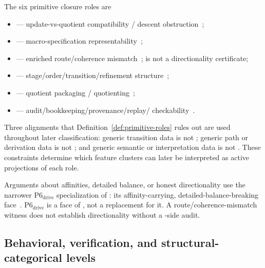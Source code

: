 \begin{definition}\label{def:primitive-roles}
The six primitive closure roles are
\begin{itemize}[topsep=2pt,itemsep=1pt]
  \item \Pone{} --- update-vs-quotient compatibility / descent
    obstruction~\citep{GrothendieckSGA1,JanelidzeTholen1994};
  \item \Ptwo{} --- macro-specification
    representability~\citep{MacLane1998};
  \item \Pthree{} --- enriched route/coherence
    mismatch~\citep{BaaderNipkow1998,Nakahara2003}; \Pthree{} is not a
    directionality certificate;
  \item \Pfour{} --- stage/order/transition/refinement
    structure~\citep{Milner1989,BackVonWright1998};
  \item \Pfive{} --- quotient packaging /
    quotienting~\citep{KemenySnell1960};
  \item \Psix{} --- audit/bookkeeping/provenance/replay/%
    checkability~\citep{GreenKarvounarakisTannen2007,Merkle1987}.
\end{itemize}
\end{definition}

\begin{remark}\label{rem:repaired-alignments}
Three alignments that Definition~\ref{def:primitive-roles} rules out
are used throughout later classification: generic transition data is
not \Pthree{}; generic path or derivation data is not \Pfive{}; and
generic semantic or interpretation data is not \Pone{}. These
constraints determine which feature clusters can later be interpreted
as active projections of each role.
\end{remark}

\begin{remark}\label{rem:p6-drive}
Arguments about affinities, detailed balance, or honest directionality
use the narrower \(\mathrm{P6}_{\mathrm{drive}}\) specialization of
\Psix{}: its affinity-carrying, detailed-balance-breaking
face~\citep{Seifert2012}. \(\mathrm{P6}_{\mathrm{drive}}\) is a face
of \Psix{}, not a replacement for it. A \Pthree{}
route/coherence-mismatch witness does not establish directionality
without a \Psix{}-side audit.
\end{remark}

\subsection{Behavioral, verification, and structural-categorical levels}\label{subsec:levels}

